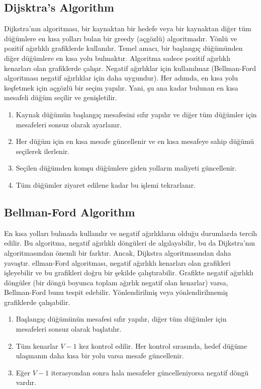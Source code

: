 \newpage

\subsection{Dijsktra's Algorithm}

Dijkstra'nın algoritması, bir kaynaktan bir hedefe veya bir kaynaktan diğer tüm düğümlere en kısa yolları bulan bir greedy (açgözlü) algoritmadır. Yönlü ve pozitif ağırlıklı grafiklerde kullanılır. Temel amacı, bir başlangıç düğümünden diğer düğümlere en kısa yolu bulmaktır. Algoritma sadece pozitif ağırlıklı kenarları olan grafiklerde çalışır. Negatif ağırlıklar için kullanılmaz (Bellman-Ford algoritması negatif ağırlıklar için daha uygundur). Her adımda, en kısa yolu keşfetmek için açgözlü bir seçim yapılır. Yani, şu ana kadar bulunan en kısa mesafeli düğüm seçilir ve genişletilir.

\begin{enumerate}
    \item Kaynak düğümün başlangıç mesafesini sıfır yapılır ve diğer tüm düğümler için mesafeleri sonsuz olarak ayarlanır.
    \item Her düğüm için en kısa mesafe güncellenir ve en kısa mesafeye sahip düğümü seçilerek ilerlenir.
    \item Seçilen düğümden komşu düğümlere giden yolların maliyeti güncellenir.
    \item Tüm düğümler ziyaret edilene kadar bu işlemi tekrarlanır.
\end{enumerate}

\newpage

\subsection{Bellman-Ford Algorithm}

En kısa yolları bulmada kullanılır ve negatif ağırlıkların olduğu durumlarda tercih edilir. Bu algoritma, negatif ağırlıklı döngüleri de algılayabilir, bu da Dijkstra'nın algoritmasından önemli bir farktır. Ancak, Dijkstra algoritmasından daha yavaştır. ellman-Ford algoritması, negatif ağırlıklı kenarları olan grafikleri işleyebilir ve bu grafikleri doğru bir şekilde çalıştırabilir.  Grafikte negatif ağırlıklı döngüler (bir döngü boyunca toplam ağırlık negatif olan kenarlar) varsa, Bellman-Ford bunu tespit edebilir. Yönlendirilmiş veya yönlendirilmemiş grafiklerde çalışabilir.

\begin{enumerate}
    \item Başlangıç düğümünün mesafesi sıfır yapılır, diğer tüm düğümler için mesafeleri sonsuz olarak başlatılır.
    \item Tüm kenarlar $V - 1$ kez kontrol edilir. Her kontrol sırasında, hedef düğüme ulaşmanın daha kısa bir yolu varsa mesafe güncellenir.
    \item Eğer $V - 1$ iterasyondan sonra hala mesafeler güncelleniyorsa negatif döngü vardır.
\end{enumerate}

